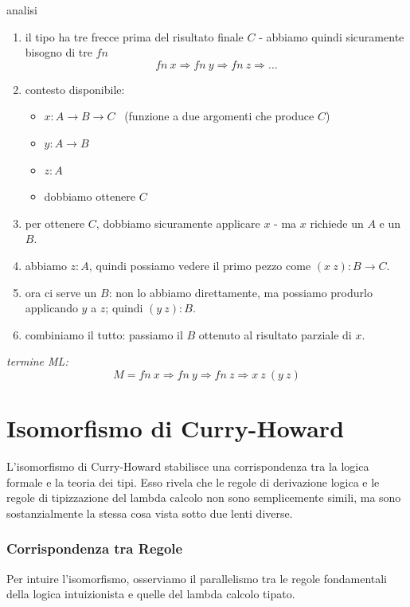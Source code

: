 \documentclass[a4paper,11pt]{report}
\begin{document}
\begin{itemize}
\begin{gframe}{analisi}{}
    \vspace{-1em}
    \begin{enumerate}
        \item il tipo ha tre frecce prima del risultato finale $C$ - abbiamo quindi sicuramente bisogno di tre \( fn \)
        \[ fn \ x \Rightarrow fn \ y \Rightarrow fn \ z \Rightarrow \dots \]
        \item contesto disponibile:
        \begin{itemize}
            \item $x : A \to B \to C$ \ (funzione a due argomenti che produce $C$)
            \item $y : A \to B$ 
            \item $z : A$ 
            \item dobbiamo ottenere $C$
        \end{itemize}
    \item per ottenere $C$, dobbiamo sicuramente applicare $x$ - ma $x$ richiede un $A$ e un $B$.
        \item abbiamo $z: A$, quindi possiamo vedere il primo pezzo come $(x \ z) : B \to C$.
        \item ora ci serve un $B$: non lo abbiamo direttamente, ma possiamo produrlo applicando $y$ a $z$; quindi $(y \ z) : B$.
        \item combiniamo il tutto: passiamo il $B$ ottenuto al risultato parziale di $x$.
    \end{enumerate}
    \textit{termine ML:}
    \[ M = fn \ x \Rightarrow fn \ y \Rightarrow fn \ z \Rightarrow x \ z \ (y \ z) \]
\end{gframe}

\end{itemize}

\chapter{Isomorfismo di Curry-Howard}

L'isomorfismo di Curry-Howard stabilisce una corrispondenza tra la logica formale e la teoria dei tipi. Esso rivela che le regole di derivazione logica e le regole di tipizzazione del lambda calcolo non sono semplicemente simili, ma sono sostanzialmente la stessa cosa vista sotto due lenti diverse.

\subsection{Corrispondenza tra Regole}
Per intuire l'isomorfismo, osserviamo il parallelismo tra le regole fondamentali della logica intuizionista e quelle del lambda calcolo tipato.
\end{document}
